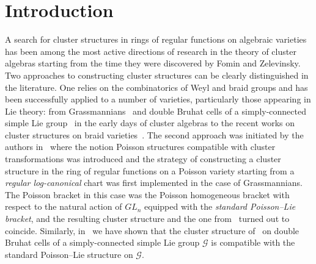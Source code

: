 \documentclass{amsart}
\theoremstyle{definition}
\theoremstyle{remark}
\numberwithin{equation}{section}
\numberwithin{theorem}{section}
\def\G{{\mathcal G}}
\begin{document}

\maketitle

\tableofcontents

\section{Introduction} 
A search for cluster structures in rings of regular functions on algebraic varieties has been among the most active directions of research in the theory of cluster algebras starting from the time they were discovered by Fomin and Zelevinsky.   Two approaches to constructing cluster structures can be clearly distinguished in the literature. One relies on the combinatorics of Weyl and braid groups and has been successfully applied to a number of varieties, particularly those  appearing in Lie theory: from Grassmannians~\cite{Scott} and double Bruhat cells of a simply-connected simple Lie group~\cite{BFZ} in the early days of cluster algebras to the recent works on cluster structures on braid 
varieties~\cite{CGGLSS}. The second approach was  initiated by the authors in~\cite{GSV1} where the notion Poisson structures compatible with cluster transformations was introduced and the strategy of constructing a cluster structure in the ring of regular functions on a Poisson variety starting from a {\em regular log-canonical} chart was first implemented in the case of Grassmannians. The Poisson bracket in this case was the Poisson homogeneous bracket with respect to the natural action of $GL_n$ equipped with the {\em standard Poisson--Lie bracket}, and the resulting cluster structure and the one from~\cite{Scott} turned out to coincide. Similarly, in~\cite[Ch.~4.3]{GSVb} we have shown that the cluster structure of~\cite{BFZ} on double Bruhat cells of a simply-connected simple Lie group $\G$ is compatible with the standard Poisson--Lie structure on $\G$.
 
\end{document}
